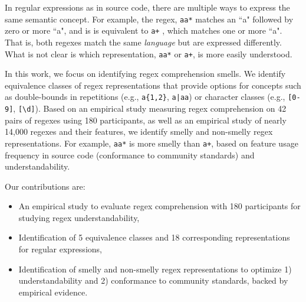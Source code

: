In regular expressions as in source code, there are multiple ways to express the same semantic concept.
For example, the regex, \verb!aa*! matches an ``a" followed by zero or more ``a", and is is equivalent to \verb!a+! , which matches one or more ``a".
That is, both regexes match the same \emph{language} but are expressed differently. What is not clear is which representation,  \verb!aa*!  or  \verb!a+!, is more easily understood.

In this work, we focus on identifying regex comprehension smells.
We  identify equivalence classes of regex representations that provide options for concepts such as double-bounds in repetitions (e.g., \verb!a{1,2}!, \verb!a|aa!) or
character classes (e.g., \verb![0-9]!, \verb![\d]!).
Based on an empirical study measuring regex comprehension on 42 pairs of regexes using 180 participants, as well as an empirical study of nearly 14,000 regexes and their features, we identify smelly and non-smelly regex representations. For example, \verb!aa*!  is more smelly than  \verb!a+!, based on feature usage frequency in source code (conformance to community standards) and understandability.

Our contributions are:
\begin{itemize}
\item An empirical study to evaluate regex comprehension with 180 participants for studying regex understandability,
\item Identification of 5 equivalence classes and 18 corresponding representations for regular expressions,
\item Identification of smelly and non-smelly regex representations to optimize 1) understandability and 2) conformance to community standards, backed by empirical evidence.
\end{itemize}

